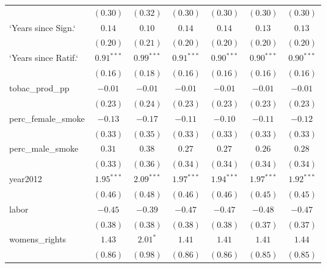 \begin{table}[!h]
\begin{center}
\begin{tabular}{l c c c c c c }
                        & $(0.30)$     & $(0.32)$     & $(0.30)$     & $(0.30)$     & $(0.30)$     & $(0.30)$     \\
`Years since Sign.`     & $0.14$       & $0.10$       & $0.14$       & $0.14$       & $0.13$       & $0.13$       \\
                        & $(0.20)$     & $(0.21)$     & $(0.20)$     & $(0.20)$     & $(0.20)$     & $(0.20)$     \\
`Years since Ratif.`    & $0.91^{***}$ & $0.99^{***}$ & $0.91^{***}$ & $0.90^{***}$ & $0.90^{***}$ & $0.90^{***}$ \\
                        & $(0.16)$     & $(0.18)$     & $(0.16)$     & $(0.16)$     & $(0.16)$     & $(0.16)$     \\
tobac\_prod\_pp         & $-0.01$      & $-0.01$      & $-0.01$      & $-0.01$      & $-0.01$      & $-0.01$      \\
                        & $(0.23)$     & $(0.24)$     & $(0.23)$     & $(0.23)$     & $(0.23)$     & $(0.23)$     \\
perc\_female\_smoke     & $-0.13$      & $-0.17$      & $-0.11$      & $-0.10$      & $-0.11$      & $-0.12$      \\
                        & $(0.33)$     & $(0.35)$     & $(0.33)$     & $(0.33)$     & $(0.33)$     & $(0.33)$     \\
perc\_male\_smoke       & $0.31$       & $0.38$       & $0.27$       & $0.27$       & $0.26$       & $0.28$       \\
                        & $(0.33)$     & $(0.36)$     & $(0.34)$     & $(0.34)$     & $(0.34)$     & $(0.34)$     \\
year2012                & $1.95^{***}$ & $2.09^{***}$ & $1.97^{***}$ & $1.94^{***}$ & $1.97^{***}$ & $1.92^{***}$ \\
                        & $(0.46)$     & $(0.48)$     & $(0.46)$     & $(0.46)$     & $(0.45)$     & $(0.45)$     \\
labor                   & $-0.45$      & $-0.39$      & $-0.47$      & $-0.47$      & $-0.48$      & $-0.47$      \\
                        & $(0.38)$     & $(0.38)$     & $(0.38)$     & $(0.38)$     & $(0.37)$     & $(0.37)$     \\
womens\_rights          & $1.43$       & $2.01^{*}$   & $1.41$       & $1.41$       & $1.41$       & $1.44$       \\
                        & $(0.86)$     & $(0.98)$     & $(0.86)$     & $(0.86)$     & $(0.85)$     & $(0.85)$     \\

\end{tabular}
\end{center}
\end{table}
